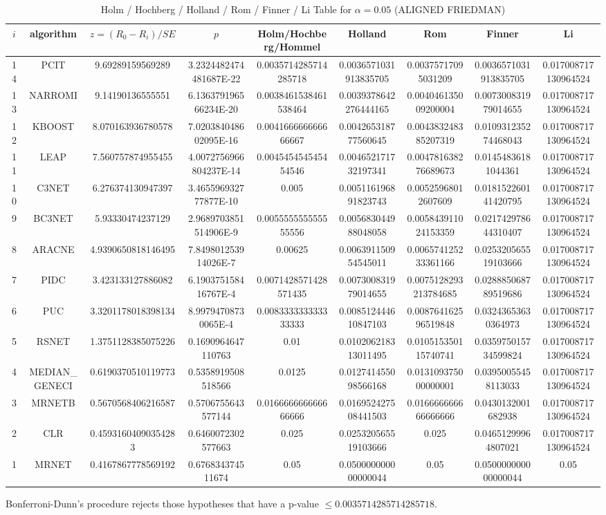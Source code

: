 \documentclass[a4paper,10pt]{article}
\begin{document}
\begin{landscape}
\begin{table}[!htp]
\centering\scriptsize
\caption{Holm / Hochberg / Holland / Rom / Finner / Li Table for $\alpha=0.05$ (ALIGNED FRIEDMAN)}
\begin{tabular}{ccccccccc}
$i$&algorithm&$z=(R_0 - R_i)/SE$&$p$&Holm/Hochberg/Hommel&Holland&Rom&Finner&Li\\
\hline
14&PCIT&9.69289159569289&3.2324482474481687E-22&0.0035714285714285718&0.0036571031913835705&0.00375717095031209&0.0036571031913835705&0.017008717130964524\\
13&NARROMI&9.14190136555551&6.136379196566234E-20&0.0038461538461538464&0.0039378642276444165&0.004046135009200004&0.007300831979014655&0.017008717130964524\\
12&KBOOST&8.070163936780578&7.020384048602095E-16&0.004166666666666667&0.004265318777560645&0.004383248385207319&0.010931235274468043&0.017008717130964524\\
11&LEAP&7.560757874955455&4.0072756966804237E-14&0.004545454545454546&0.004652171732197341&0.004781638276689673&0.01454836181044361&0.017008717130964524\\
10&C3NET&6.276374130947397&3.465596932777877E-10&0.005&0.005116196891823743&0.00525968012607609&0.018152260141420795&0.017008717130964524\\
9&BC3NET&5.93330474237129&2.9689703851514906E-9&0.005555555555555556&0.005683044988048058&0.005843911024153359&0.021742978644310407&0.017008717130964524\\
8&ARACNE&4.9390650818146495&7.849801253914026E-7&0.00625&0.006391150954545011&0.006574125233361166&0.025320565519103666&0.017008717130964524\\
7&PIDC&3.423133127886082&6.190375158416767E-4&0.0071428571428571435&0.007300831979014655&0.0075128293213784685&0.028885068789519686&0.017008717130964524\\
6&PUC&3.3201178018398134&8.99794708730065E-4&0.008333333333333333&0.008512444610847103&0.008764162596519848&0.03243653630364973&0.017008717130964524\\
5&RSNET&1.3751128385075226&0.1690964647110763&0.01&0.010206218313011495&0.010515350115740741&0.035975015734599824&0.017008717130964524\\
4&MEDIAN_GENECI&0.6190370510119773&0.5358919508518566&0.0125&0.012741455098566168&0.013109375000000001&0.03950055458113033&0.017008717130964524\\
3&MRNETB&0.5670568406216587&0.5706755643577144&0.016666666666666666&0.016952427508441503&0.016666666666666666&0.0430132001682938&0.017008717130964524\\
2&CLR&0.45931604090354283&0.6460072302577663&0.025&0.025320565519103666&0.025&0.04651299964807021&0.017008717130964524\\
1&MRNET&0.4167867778569192&0.676834374511674&0.05&0.050000000000000044&0.05&0.050000000000000044&0.05\\
\hline
\end{tabular}
\end{table}
Bonferroni-Dunn's procedure rejects those hypotheses that have a p-value $\le0.0035714285714285718$.



\end{landscape}
\end{document}
